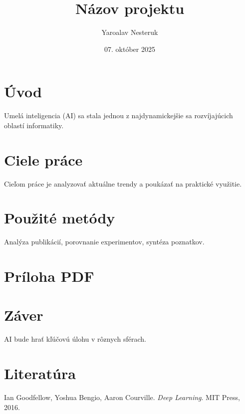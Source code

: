 \documentclass{article}
\title{Názov projektu}
\author{Yaroalav Nesteruk}
\date{07. október 2025}
\begin{document}
\maketitle

\section{Úvod}
Umelá inteligencia (AI) sa stala jednou z najdynamickejšie sa rozvíjajúcich oblastí informatiky.

\section{Ciele práce}
Cieľom práce je analyzovať aktuálne trendy a poukázať na praktické využitie.

\section{Použité metódy}
Analýza publikácií, porovnanie experimentov, syntéza poznatkov.

\section{Príloha PDF}


\section{Záver}
AI bude hrať kľúčovú úlohu v rôznych sférach.

\section{Literatúra}
\begin{thebibliography}{9}
Ian Goodfellow, Yoshua Bengio, Aaron Courville. \emph{Deep Learning}. MIT Press, 2016.
\end{thebibliography}
\end{document}
